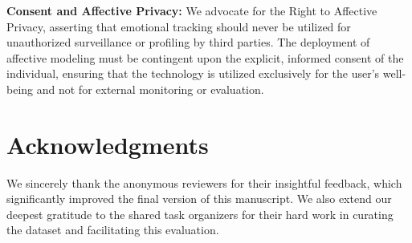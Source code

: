 \documentclass[11pt, a4paper]{article}
\begin{document}
\textbf{Consent and Affective Privacy:} We advocate for the Right to Affective Privacy, asserting that emotional tracking should never be utilized for unauthorized surveillance or profiling by third parties. The deployment of affective modeling must be contingent upon the explicit, informed consent of the individual, ensuring that the technology is utilized exclusively for the user's well-being and not for external monitoring or evaluation.

\section*{Acknowledgments}
We sincerely thank the anonymous reviewers for their insightful feedback, which significantly improved the final version of this manuscript. We also extend our deepest gratitude to the shared task organizers for their hard work in curating the dataset and facilitating this evaluation.


\end{document}
